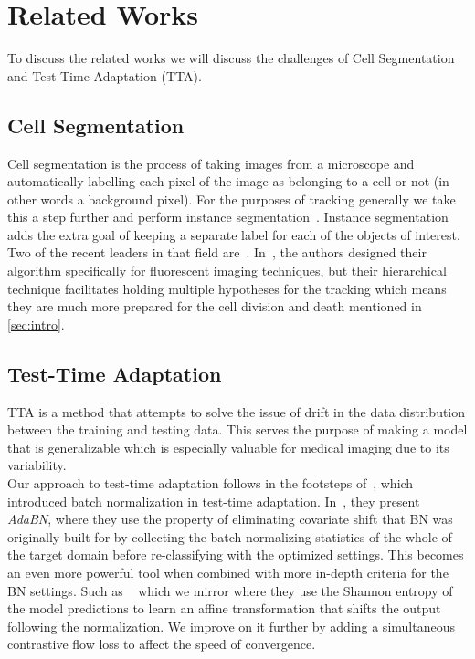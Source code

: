 \section{Related Works}
\label{sec:RW}
To discuss the related works we will discuss the challenges of Cell Segmentation and Test-Time Adaptation (TTA).

\subsection{Cell Segmentation}

Cell segmentation is the process of taking images from a microscope and automatically labelling each pixel of the image as belonging to a cell or not (in other words a background pixel).  For the purposes of tracking generally we take this a step further and perform instance segmentation~\cite{Yang_2019_ICCV}.  Instance segmentation adds the extra goal of keeping a separate label for each of the objects of interest.  \\ 

Two of the recent leaders in that field are~\cite{bragantini2024ucmtracking,chen2024cmtt}.  In~\cite{bragantini2024ucmtracking}, the authors designed their algorithm specifically for fluorescent imaging techniques, but their hierarchical technique facilitates holding multiple hypotheses for the tracking which means they are much more prepared for the cell division and death mentioned in \ref{sec:intro}.  


\subsection{Test-Time Adaptation}
\label{sec:TTARW}

TTA is a method that attempts to solve the issue of drift in the data distribution between the training and testing data. This serves the purpose of making a model that is generalizable which is especially valuable for medical imaging due to its variability. 
\\

Our approach to test-time adaptation follows in the footsteps of~\cite{Li2018-el}, which introduced batch normalization in test-time adaptation. In~\cite{Li2018-el}, they present \textit{AdaBN}, where they use the property of eliminating covariate shift that BN was originally built for by collecting the batch normalizing statistics of the whole of the target domain before re-classifying with the optimized settings.  This becomes an even more powerful tool when combined with more in-depth criteria for the BN settings.  Such as ~\cite{wang2020tent} which we mirror where they use the Shannon entropy of the model predictions to learn an affine transformation that shifts the output following the normalization.  We improve on it further by adding a simultaneous contrastive flow loss to affect the speed of convergence.\\

